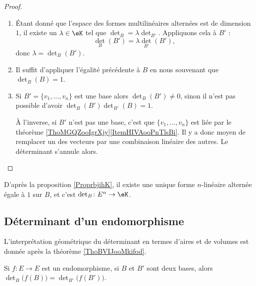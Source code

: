\begin{proof}
\begin{enumerate}
        \item
            Étant donné que l'espace des formes multilinéaires alternées est de dimension \( 1\), il existe un \( \lambda\in \eK\) tel que \( \det_B=\lambda\det_{B'}\). Appliquons cela à \( B'\) :
            \begin{equation}
                \det_B(B')=\lambda\det_{B'}(B'),
            \end{equation}
            donc \( \lambda=\det_B(B')\).
        \item
            Il suffit d'appliquer l'égalité précédente à \( B\) en nous souvenant que \( \det_B(B)=1\).
        \item
            Si \( B'=\{ v_1,\ldots, v_n \}\) est une base alors \( \det_B(B')\neq 0\), sinon il n'est pas possible d'avoir \( \det_B(B')\det_{B'}(B)=1\).

            À l'inverse, si \( B'\) n'est pas une base, c'est que \( \{ v_1,\ldots, v_n \}\) est liée par le théorème \ref{ThoMGQZooIgrXjy}\ref{ItemHIVAooPnTlsBi}. Il y a donc moyen de remplacer un des vecteurs par une combinaison linéaire des autres. Le déterminant s'annule alors.
    \end{enumerate}
\end{proof}

D'après la proposition \ref{ProprbjihK}, il existe une unique forme \( n\)-linéaire alternée égale à \( 1\) sur \( B\), et c'est \( \det_B\colon E^n\to \eK\).

\subsection{Déterminant d'un endomorphisme}

L'interprétation géométrique du déterminant en termes d'aires et de volumes est donnée après la théorème \ref{ThoBVIJooMkifod}.

\begin{lemma}       \label{LEMooQTRVooAKzucd}
    Si \( f\colon E\to E\) est un endomorphisme, si \( B\) et \( B'\) sont deux bases, alors \( \det_B\big( f(B) \big)=\det_{B'}\big( f(B') \big)  \).
\end{lemma}

